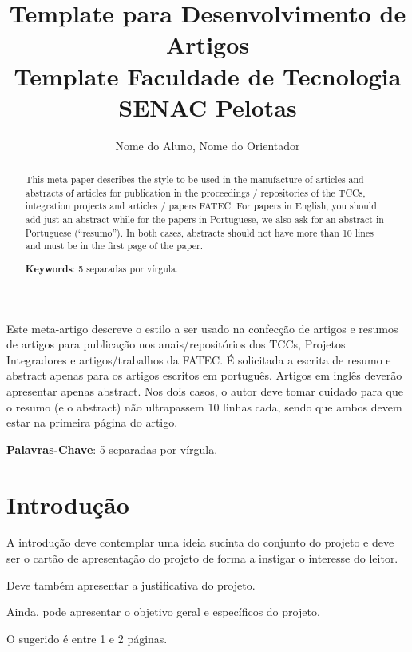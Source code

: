 \documentclass[12pt]{article}
\title{Template para Desenvolvimento de Artigos\\ Template Faculdade de Tecnologia SENAC Pelotas}
\author{Nome do Aluno\inst{1}, Nome do Orientador\inst{1}}
\begin{document}
 

\maketitle
\begin{abstract}
  This meta-paper describes the style to be used in the manufacture of articles and abstracts of articles for publication in the proceedings / repositories of the TCCs, integration projects and articles / papers FATEC. For papers in English, you should add just an abstract
  while for the papers in Portuguese, we also ask for an abstract in
  Portuguese (``resumo''). In both cases, abstracts should not have more than
  10 lines and must be in the first page of the paper.
  
  \textbf{Keywords}: 5 separadas por vírgula.
\end{abstract}
\begin{resumo} 
  Este meta-artigo descreve o estilo a ser usado na confecção de artigos e
  resumos de artigos para publicação nos anais/repositórios dos TCCs, Projetos Integradores e artigos/trabalhos da FATEC. É solicitada a escrita de resumo e abstract apenas para os artigos
  escritos em português. Artigos em inglês deverão apresentar apenas abstract.
  Nos dois casos, o autor deve tomar cuidado para que o resumo (e o abstract)
  não ultrapassem 10 linhas cada, sendo que ambos devem estar na primeira
  página do artigo.
  
  \textbf{Palavras-Chave}: 5 separadas por vírgula.
\end{resumo}

\section{Introdução} 

A introdução deve contemplar uma ideia sucinta do conjunto do projeto e deve ser o cartão de apresentação do projeto de forma a instigar o interesse do leitor.

Deve também apresentar a justificativa do projeto.

Ainda, pode apresentar o objetivo geral e específicos do projeto.

O sugerido é entre 1 e 2 páginas.
\end{document}
